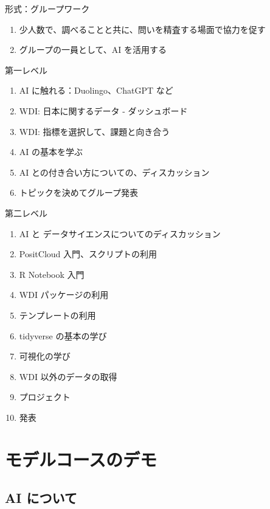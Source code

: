 \documentclass[
]{bxjsbook}
\providecommand{\tightlist}{%
  \setlength{\itemsep}{0pt}\setlength{\parskip}{0pt}}
\theoremstyle{definition}
\theoremstyle{definition}
\theoremstyle{definition}
\theoremstyle{definition}
\theoremstyle{remark}
\begin{document}
形式：グループワーク

\begin{enumerate}
\def\labelenumi{\arabic{enumi}.}
\tightlist
\item
  少人数で、調べることと共に、問いを精査する場面で協力を促す
\item
  グループの一員として、AI を活用する
\end{enumerate}

第一レベル

\begin{enumerate}
\def\labelenumi{\arabic{enumi}.}
\tightlist
\item
  AI に触れる：Duolingo、ChatGPT など
\item
  WDI: 日本に関するデータ - ダッシュボード
\item
  WDI: 指標を選択して、課題と向き合う
\item
  AI の基本を学ぶ
\item
  AI との付き合い方についての、ディスカッション
\item
  トピックを決めてグループ発表
\end{enumerate}

第二レベル

\begin{enumerate}
\def\labelenumi{\arabic{enumi}.}
\tightlist
\item
  AI と データサイエンスについてのディスカッション
\item
  PositCloud 入門、スクリプトの利用
\item
  R Notebook 入門
\item
  WDI パッケージの利用
\item
  テンプレートの利用
\item
  tidyverse の基本の学び
\item
  可視化の学び
\item
  WDI 以外のデータの取得
\item
  プロジェクト
\item
  発表
\end{enumerate}

\hypertarget{coursedemo}{%
\section{モデルコースのデモ　}\label{coursedemo}}

\hypertarget{ai-ux306bux3064ux3044ux3066}{%
\subsection{AI について}\label{ai-ux306bux3064ux3044ux3066}}
\end{document}
